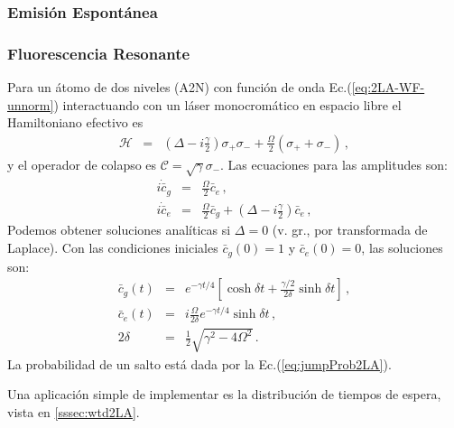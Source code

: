 \documentclass[twocolumn,aps,eqsecnum,showkeys,amsmath]{revtex4}
\newcommand{\mcC}{\mathcal{C}}
\newcommand{\mcH}{\mathcal{H}} 	%
\begin{document}
\subsubsection{Emisi\'on Espont\'anea} %

\subsubsection{Fluorescencia Resonante} %
Para un \'atomo de dos niveles (A2N) con funci\'on de onda 
Ec.(\ref{eq:2LA-WF-unnorm}) interactuando con un l\'aser 
monocrom\'atico en espacio libre el Hamiltoniano efectivo es 
%
\begin{eqnarray} 
\mcH &=& (\Delta - i \frac{\gamma}{2})  \sigma_+ \sigma_-   
	+\frac{\Omega}{2} (\sigma_+ +\sigma_-) \,,
\end{eqnarray}
y el operador de colapso es $ \mcC = \sqrt{\gamma} \sigma_-$. Las 
ecuaciones para las amplitudes son:
%
\begin{subequations}
\label{eq:DirectSSEamp}
\begin{eqnarray}
i \dot{\bar{c}}_g &=& \frac{\Omega}{2} \bar{c}_e  \,, \\
%
i \dot{\bar{c}}_e &=& \frac{\Omega}{2} \bar{c}_g 
	+(\Delta -i\frac{\gamma}{2}) \bar{c}_e \,,
\end{eqnarray}
\end{subequations}
Podemos obtener soluciones anal\'iticas si $\Delta=0$ (v. gr., por 
transformada de Laplace). Con las condiciones iniciales $\bar{c}_g(0) =1$
y $\bar{c}_e(0)=0$, las soluciones son: 
%
\begin{subequations}		\label{eq:QJ2LA-sol}
\begin{eqnarray}
\bar{c}_g (t) &=& e^{-\gamma t/4} \left[ \cosh{ \delta t} 
	+\frac{\gamma/2}{2\delta} \sinh{\delta t}   \right]  \,, \\
%
\bar{c}_e (t) &=& i \frac{\Omega}{2\delta} e^{-\gamma t/4} \sinh{\delta t}  \,, \\
%
2\delta &=& \frac{1}{2} \sqrt{\gamma^2 -4\Omega^2}  \,.
\end{eqnarray}
\end{subequations}
La probabilidad de un salto est\'a dada por la Ec.(\ref{eq:jumpProb2LA}). 

Una aplicaci\'on simple de implementar es la distribuci\'on de tiempos 
de espera, vista en \ref{sssec:wtd2LA}. 
\end{document}
